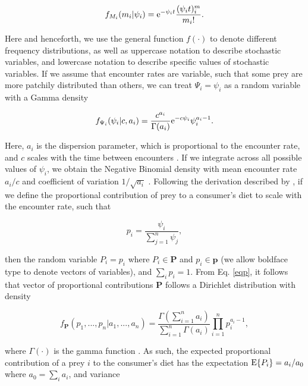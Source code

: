 \documentclass{frontiersSCNS}
\begin{document}
\begin{equation}
f_{M_i} (m_i|\psi_i) = {\rm e}^{-\psi_i t}\frac{(\psi_i t)^m_i}{m_i!}.
\end{equation}

\noindent Here and henceforth, we use the general function $f(\cdot)$ to denote different frequency distributions, as well as uppercase notation to describe stochastic variables, and lowercase notation to describe specific values of stochastic variables.
If we assume that encounter rates are variable, such that some prey are more patchily distributed than others, we can treat $\Psi_i = \psi_i$ as a random variable with a Gamma density 

\begin{equation}
f_{\Psi_i} (\psi_i | c, a_i) = \frac{c^{a_i}}{\Gamma (a_i)}{\rm e}^{-c \psi_i}\psi_i^{a_i - 1}.
\end{equation}

\noindent Here, $a_i$ is the dispersion parameter, which is proportional to the encounter rate, and $c$ scales with the time between encounters \citep{Mangel:2006wa,Ainsworth:2010uo,Yeakel:2013hi}.
If we integrate across all possible values of $\psi_i$, we obtain the Negative Binomial density with mean encounter rate $a_i/c$ and coefficient of variation $1/\sqrt{a_i}$ \citep{Hilborn:1997ds}.
Following the derivation described by \citet{Ainsworth:2010uo}, if we define the proportional contribution of prey to a consumer's diet to scale with the encounter rate, such that

\begin{equation}
\label{eqp}
  p_i = \frac{\psi_i}{\sum_{j=1}^n \psi_j},
\end{equation}

\noindent then the random variable $P_i = p_i$ where $P_i \in {\bm P}$ and $p_i \in {\bm p}$ (we allow boldface type to denote vectors of variables), and $\sum_i p_i = 1$.
From Eq. \ref{eqp}, it follows that vector of proportional contributions $\bm P$ follows a Dirichlet distribution \citep{Johnson:1960gu} with density

\begin{equation}
  f_{\bm P}(p_1,...,p_n|a_1,...,a_n) = \frac{\Gamma(\sum_{i=1}^n a_i)}{\sum_{i=1}^n\Gamma(a_i)}\prod_{i=1}^n p_i^{a_i - 1},
\end{equation}

\noindent where $\Gamma(\cdot)$ is the gamma function \citep[cf.][]{Mangel:2006wa}.
As such, the expected proportional contribution of a prey $i$ to the consumer's diet has the expectation ${\rm E}\{P_i\}=a_i/a_0$ where $a_0 = \sum_i a_i$, and variance
\end{document}
